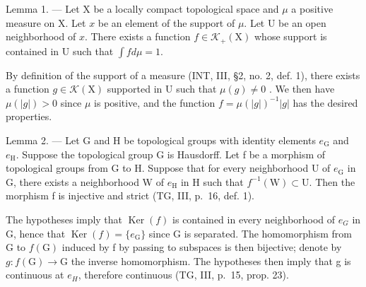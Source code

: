Lemma 1. --- Let X be a locally compact topological space and \(\mu\) a positive measure on X. Let \(x\) be an element of the support of \(\mu\). Let U be an open neighborhood of \(x\). There exists a function \(f \in \mathcal{K}_{+}(\mathrm{X})\) whose support is contained in U such that \(\int fd\mu = 1\).

By definition of the support of a measure (INT, III, §2, no. 2, def. 1), there exists a function \(g \in \mathcal{K}(\mathrm{X})\) supported in U such that \(\mu(g) \neq 0\) . We then have \(\mu(|g|) > 0\) since \(\mu\) is positive, and the function \(f = \mu(|g|)^{-1}|g|\) has the desired properties.

Lemma 2. --- Let G and H be topological groups with identity elements \(e_{\mathrm{G}}\) and \(e_{\mathrm{H}}\). Suppose the topological group G is Hausdorff. Let f be a morphism of topological groups from G to H. Suppose that for every neighborhood U of \(e_{\mathrm{G}}\) in G, there exists a neighborhood W of \(e_{\mathrm{H}}\) in H such that \(f^{-1}(\mathrm{W}) \subset \mathrm{U}\). Then the morphism f is injective and strict (TG, III, p.~16, def. 1).

The hypotheses imply that \(\operatorname{Ker}(f)\) is contained in every neighborhood of \(e_{G}\) in G, hence that \(\operatorname{Ker}(f) = \{e_{\mathrm{G}}\}\) since G is separated. The homomorphism from G to \(f(\mathrm{G})\) induced by f by passing to subspaces is then bijective; denote by \(g: f(\mathrm{G}) \to \mathrm{G}\) the inverse homomorphism. The hypotheses then imply that g is continuous at \(e_{H}\), therefore continuous (TG, III, p.~15, prop. 23).

